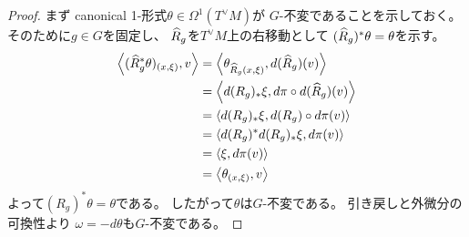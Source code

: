 \documentclass[report,dvipdfmx]{jlreq}
\begin{document}

\begin{proof}
    まず canonical 1-形式$\theta \in \Omega^1(T^\vee M)$が
    $G$-不変であることを示しておく。
    そのために$g \in G$を固定し、
    $\widehat{R}_g$を$T^\vee M$上の右移動として
    $(\widehat{R}_g)^* \theta = \theta$を示す。
    \begin{alignat}{1}
        \left\langle{(\widehat{R}_g^* \theta)_{(x, \xi)}},{v}\right\rangle
            &=
                \left\langle{\theta_{\widehat{R}_g(x, \xi)}},{d(\widehat{R}_g)(v)}\right\rangle
                \\
            &=
                \left\langle{d(R_g)_* \xi},{d\pi \circ d(\widehat{R}_g) (v)}\right\rangle
                \\
            &=
                \left\langle{d(R_g)_* \xi},{d(R_g) \circ d\pi (v)}\right\rangle
                \\
            &=
                \left\langle{d(R_g)^* d(R_g)_* \xi},{d\pi (v)}\right\rangle
                \\
            &=
                \left\langle{\xi},{d\pi (v)}\right\rangle
                \\
            &=
                \left\langle{\theta_{(x, \xi)}},{v}\right\rangle
    \end{alignat}
    よって$(R_g)^* \theta = \theta$である。
    したがって$\theta$は$G$-不変である。
    引き戻しと外微分の可換性より
    $\omega = -d\theta$も$G$-不変である。


\end{proof}
\end{document}
